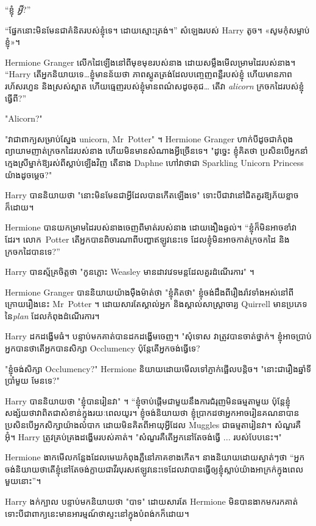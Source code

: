 “ខ្ញុំ \emph{អ្វី}?”

“ផ្នែកនោះមិនមែនជាគំនិតរបស់ខ្ញុំទេ។ ដោយស្មោះត្រង់។” សំឡេងរបស់ Harry តូច។ «សូម​កុំ​សម្លាប់​ខ្ញុំ»។

Hermione Granger លើកដៃឡើងនៅពីមុខមុខរបស់នាង ដោយសម្លឹងមើលម្រាមដៃរបស់នាង។ “Harry តើអ្នកនិយាយទេ…ខ្ញុំមានន័យថា ភាពស្លូតត្រង់ដែលបញ្ចេញពន្លឺរបស់ខ្ញុំ ហើយមានភាពរហ័សរហួន និងស្រស់ស្អាត ហើយធ្មេញរបស់ខ្ញុំមានពណ៌សដូចគុជ… តើវា \emph{alicorn} ក្រចកដៃរបស់ខ្ញុំធ្វើពី?”

"Alicorn?"

"វាជាពាក្យសម្រាប់ស្នែង unicorn, Mr~Potter" ។ Hermione Granger ហាក់បីដូចជាកំពុងព្យាយាមញាត់ក្រចកដៃរបស់នាង ហើយមិនមានសំណាងអ្វីច្រើនទេ។ "ដូច្នេះ ខ្ញុំគិតថា ប្រសិនបើអ្នកនាំក្មេងស្រីម្នាក់ឱ្យរស់ពីស្លាប់ឡើងវិញ តើនាង Daphne ហៅវាថាជា Sparkling Unicorn Princess យ៉ាងដូចម្តេច?"

Harry បាននិយាយថា "នោះមិនមែនជាអ្វីដែលបានកើតឡើងទេ" ទោះបីជាវានៅជិតគួរឱ្យភ័យខ្លាចក៏ដោយ។

Hermione បានយកម្រាមដៃរបស់នាងចេញពីមាត់របស់នាង ដោយងឿងឆ្ងល់។ “ខ្ញុំក៏មិនអាចខាំវាដែរ។ លោក~Potter តើអ្នកបានពិចារណាពីបញ្ហាឥឡូវនេះទេ ដែលខ្ញុំមិនអាចកាត់ក្រចកដៃ និងក្រចកដៃបានទេ?”

Harry បានស្ម័គ្រចិត្តថា "កូនភ្លោះ Weasley មានដាវវេទមន្តដែលគួរដំណើរការ" ។

Hermione Granger បាននិយាយយ៉ាងម៉ឺងម៉ាត់ថា "ខ្ញុំគិតថា" ខ្ញុំចង់ដឹងពីរឿងរ៉ាវទាំងអស់នៅពីក្រោយរឿងនេះ Mr~Potter ។ ដោយសារតែស្គាល់អ្នក និងស្គាល់សាស្រ្តាចារ្យ Quirrell មានប្រភេទនៃ\emph{plan} ដែលកំពុងដំណើរការ។

Harry ដកដង្ហើមធំ។ បន្ទាប់មកគាត់បានដកដង្ហើមចេញ។ "សុំទោស វាត្រូវបានចាត់ថ្នាក់។ ខ្ញុំ​អាច​ប្រាប់​អ្នក​បាន​ថា​តើ​អ្នក​បាន​សិក្សា Occlumency ប៉ុន្តែ​តើ​អ្នក​ចង់​ធ្វើ​ទេ?

"ខ្ញុំចង់សិក្សា Occlumency?" Hermione និយាយដោយមើលទៅភ្ញាក់ផ្អើលបន្តិច។ "នោះជារឿងឆ្នាំទីប្រាំមួយ មែនទេ?"

Harry បាននិយាយថា "ខ្ញុំបានរៀនវា" ។ “ខ្ញុំចាប់ផ្តើមជាមួយនឹងការជំរុញមិនធម្មតាមួយ ប៉ុន្តែខ្ញុំសង្ស័យថាវាពិតជាសំខាន់ក្នុងរយៈពេលយូរ។ ខ្ញុំចង់និយាយថា ខ្ញុំប្រាកដថាអ្នកអាចរៀនគណនាបាន ប្រសិនបើអ្នកសិក្សាយ៉ាងលំបាក ដោយមិនគិតពីអាយុអ្វីដែល Muggles ជាធម្មតារៀនវា។ សំណួរគឺ អ៊ុំ។ Harry ត្រូវគ្រប់គ្រងដង្ហើមរបស់គាត់។ "សំណួរគឺតើអ្នកនៅតែចង់ធ្វើ ... របស់បែបនេះ។"

Hermione ងាកមើលកន្លែងដែលមេឃកំពុងភ្លឺនៅភាគខាងកើត។ នាង​និយាយ​ដោយ​ស្ងាត់ៗ​ថា “អ្នក​ចង់​និយាយ​ថា​តើ​ខ្ញុំ​នៅ​តែ​ចង់​ក្លាយ​ជា​វីរបុរស​ឥឡូវ​នេះ​ទេ​ដែល​វា​បាន​ធ្វើ​ឲ្យ​ខ្ញុំ​ស្លាប់​យ៉ាង​អាក្រក់​ក្នុង​ពេល​មួយ​នោះ”។

Harry ងក់ក្បាល បន្ទាប់មកនិយាយថា "បាទ" ដោយសារតែ Hermione មិនបានងាកមករកគាត់ ទោះបីជាពាក្យនេះមានអារម្មណ៍ថាស្ទះនៅក្នុងបំពង់កក៏ដោយ។

